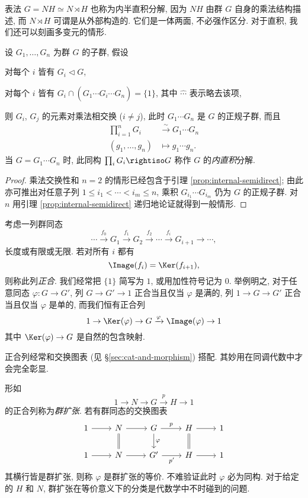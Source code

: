 表法 $G = NH \simeq N \rtimes H$ 也称为内半直积分解, 因为 $NH$ 由群 $G$ 自身的乘法结构描述, 而 $N \rtimes H$ 可谓是从外部构造的. 它们是一体两面, 不必强作区分. 对于直积, 我们还可以刻画多变元的情形.
\begin{lemma}\label{prop:internal-direct}
	设 $G_1, \ldots, G_n$ 为群 $G$ 的子群, 假设
	\begin{compactitem}
		\item 对每个 $i$ 皆有 $G_i \lhd G$,
		\item 对每个 $i$ 皆有 $G_i \cap (G_1 \cdots \widehat{G_i} \cdots G_n) = \{1\}$, 其中 $\widehat{\cdots}$ 表示略去该项,
	\end{compactitem}
	则 $G_i$, $G_j$ 的元素对乘法相交换 ($i \neq j$), 此时 $G_1 \cdots G_n$ 是 $G$ 的正规子群, 而且
	\begin{align*}
		\prod_{i=1}^n G_i & \stackrel{\sim}{\longrightarrow} G_1 \cdots G_n \\
		(g_1, \ldots, g_n) & \longmapsto g_1 \cdots g_n.
	\end{align*}
	 当 $G = G_1 \cdots G_n$ 时, 此同构 $\prod_i G_i \rightiso G$ 称作 $G$ 的\emph{内直积}分解.
\end{lemma}
\begin{proof}
	乘法交换性和 $n=2$ 的情形已经包含于引理 \ref{prop:internal-semidirect}; 由此亦可推出对任意子列 $1 \leq i_1 < \cdots < i_m \leq n$, 乘积 $G_{i_1} \cdots G_{i_m}$ 仍为 $G$ 的正规子群. 对 $n$ 用引理 \ref{prop:internal-semidirect} 递归地论证就得到一般情形.
\end{proof}

\begin{definition}[正合列] \label{def:exact-seq-group}
	考虑一列群同态
	\[ \cdots \xrightarrow{f_0} G_1 \xrightarrow{f_1} G_2 \xrightarrow{f_2} \cdots \xrightarrow{f_i} G_{i+1} \to \cdots, \]
	长度或有限或无限. 若对所有 $i$ 都有
	\[ \Image(f_i) = \Ker(f_{i+1}), \]
	则称此列\emph{正合}. 我们经常把 $\{1\}$ 简写为 $1$, 或用加性符号记为 $0$. 举例明之, 对于任意同态 $\varphi: G \to G'$, 列 $G \to G' \to 1$ 正合当且仅当 $\varphi$ 是满的, 列 $1 \to G \to G'$ 正合当且仅当 $\varphi$ 是单的, 而我们恒有正合列
	\[ 1 \to \Ker(\varphi) \to G \xrightarrow{\varphi} \Image(\varphi)  \to 1 \]
	其中 $\Ker(\varphi) \to G$ 是自然的包含映射.
\end{definition}
正合列经常和交换图表 (见 \S\ref{sec:cat-and-morphism}) 搭配. 其妙用在同调代数中才会完全彰显.

形如
\[ 1 \to N \to G \xrightarrow{p} H \to 1 \]
的正合列称为\emph{群扩张}. 若有群同态的交换图表
\[\begin{tikzcd}
	1 \arrow[r] & N \arrow[r] \arrow[equal, d] & G \arrow[r, "p"] \arrow[d, "\varphi"] & H \arrow[equal, d] \arrow[r] & 1 \\
	1 \arrow[r] & N \arrow[r] & G' \arrow[r, "{p'}"'] & H \arrow[r] & 1
\end{tikzcd}\]
其横行皆是群扩张, 则称 $\varphi$ 是群扩张的等价. 不难验证此时 $\varphi$ 必为同构. 对于给定的 $H$ 和 $N$, 群扩张在等价意义下的分类是代数学中不时碰到的问题.

